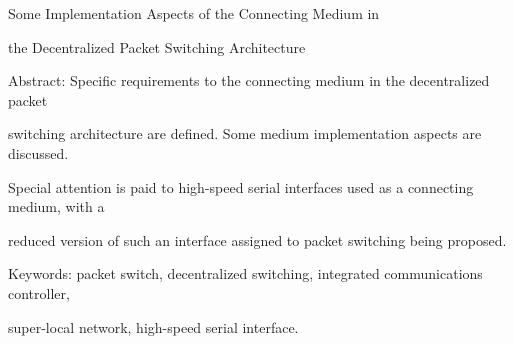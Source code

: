 Some Implementation Aspects of the Connecting Medium in 


the Decentralized Packet Switching Architecture





Abstract: Specific requirements to the connecting medium in the decentralized packet 


switching architecture are defined. Some medium implementation aspects are discussed. 


Special attention is paid to high-speed serial interfaces used as a connecting medium, with a 


reduced version of such an interface assigned to packet switching being proposed.


Keywords: packet switch, decentralized switching, integrated communications controller, 


super-local network, high-speed serial interface.


